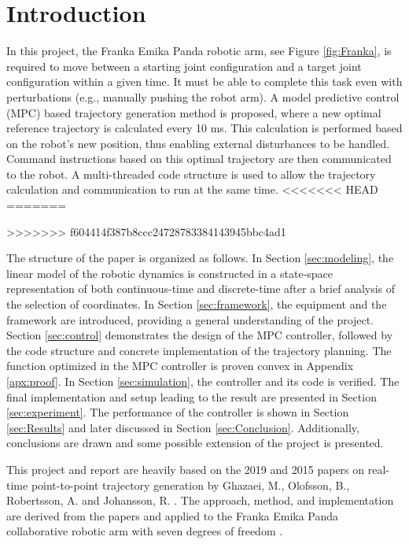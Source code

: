 \documentclass[final]{LTHtwocol} %
\begin{document}
\section{Introduction}

In this project, the Franka Emika Panda robotic arm, see Figure \ref{fig:Franka}, is required to move between a starting joint configuration and a target joint configuration within a given time. It must be able to complete this task even with perturbations (e.g., manually pushing the robot arm). A model predictive control (MPC) based trajectory generation method is proposed, where a new optimal reference trajectory is calculated every 10 ms. This calculation is performed based on the robot’s new position, thus enabling external disturbances to be handled. Command instructions based on this optimal trajectory are then communicated to the robot. A multi-threaded code structure is used to allow the trajectory calculation and communication to run at the same time.
<<<<<<< HEAD
=======

>>>>>>> f604414f387b8ccc24728783384143945bbc4ad1

The structure of the paper is organized as follows. 
In Section \ref{sec:modeling}, the linear model of the robotic dynamics is constructed in a state-space representation of both continuous-time and discrete-time after a brief analysis of the selection of coordinates.  
In Section \ref{sec:framework}, the equipment and the framework are introduced, providing a general understanding of the project. 
Section \ref{sec:control} demonstrates the design of the MPC controller, followed by the code structure and concrete implementation of the trajectory planning. The function optimized in the MPC controller is proven convex in Appendix \ref{apx:proof}.
In Section \ref{sec:simulation}, the controller and its code is verified. The final implementation and setup leading to the result are presented in Section \ref{sec:experiment}.
The performance of the controller is shown in Section \ref{sec:Results} and later discussed in Section \ref{sec:Conclusion}. Additionally, conclusions are drawn and some possible extension of the project is presented.

This project and report are heavily based on the 2019 and 2015 papers on real-time point-to-point trajectory generation by Ghazaei, M., Olofsson, B., Robertsson, A. and Johansson, R. \cite{MPC2019} \cite{MPC2015}. The approach, method, and implementation are derived from the papers and applied to the Franka Emika Panda collaborative robotic arm with seven degrees of freedom \cite{frankaweb}.
\end{document}
